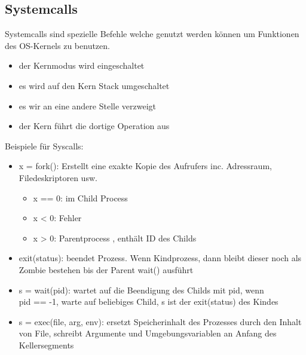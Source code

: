 \documentclass[12pt,a4paper]{article}
\begin{document}
\subsection{Systemcalls}
Systemcalls sind spezielle Befehle welche genutzt werden können um Funktionen des OS-Kernels zu benutzen. 
\begin{itemize}
\item der Kernmodus wird eingeschaltet
\item es wird auf den Kern Stack umgeschaltet
\item es wir an eine andere Stelle verzweigt
\item der Kern führt die dortige Operation aus
\end{itemize}

Beispiele für Syscalls:
\begin{itemize}
\item x = fork(): Erstellt eine exakte Kopie des Aufrufers inc. Adressraum, Filedeskriptoren usw.\begin{itemize}
\item x == 0: im Child Process
\item x < 0: Fehler
\item x > 0: Parentprocess , enthält ID des Childs
\end{itemize}
\item exit(status): beendet Prozess. Wenn Kindprozess, dann bleibt dieser noch als Zombie bestehen bis der Parent wait() ausführt
\item s = wait(pid): wartet auf die Beendigung des Childs mit pid, wenn\\ pid == -1, warte auf beliebiges Child, s ist der exit(status) des Kindes
\item s = exec(file, arg, env): ersetzt Speicherinhalt des Prozesses durch den Inhalt von File, schreibt Argumente und Umgebungsvariablen an Anfang des Kellersegments
\end{itemize}
\end{document}
